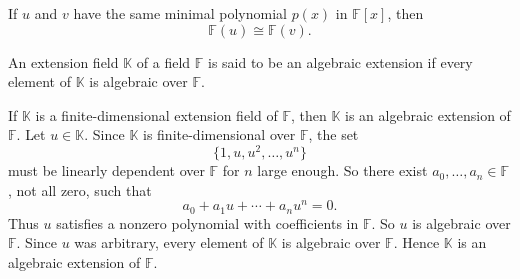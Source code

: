 \begin{corollary}{
If $u$ and $v$ have the same minimal polynomial $p(x)$ in $\mathbb{F}[x]$, then
\[
\mathbb{F}(u)\cong\mathbb{F}(v).
\]
}
\end{corollary}

\begin{definition}
An extension field $\mathbb{K}$ of a field $\mathbb{F}$ is said to be an algebraic extension if every element of $\mathbb{K}$ is algebraic over $\mathbb{F}$.
\end{definition}

\begin{theorem}{
If $\mathbb{K}$ is a finite-dimensional extension field of $\mathbb{F}$, then $\mathbb{K}$ is an algebraic extension of $\mathbb{F}$.
}
Let $u\in\mathbb{K}$.
Since $\mathbb{K}$ is finite-dimensional over $\mathbb{F}$, the set
\[
\{1,u,u^2,\hdots,u^n\}
\]
must be linearly dependent over $\mathbb{F}$ for $n$ large enough.
So there exist $a_0,\hdots,a_n\in\mathbb{F}$, not all zero, such that
\[
a_0+a_1u+\cdots+a_nu^n=0.
\]
Thus $u$ satisfies a nonzero polynomial with coefficients in $\mathbb{F}$.
So $u$ is algebraic over $\mathbb{F}$.
Since $u$ was arbitrary, every element of $\mathbb{K}$ is algebraic over $\mathbb{F}$.
Hence $\mathbb{K}$ is an algebraic extension of $\mathbb{F}$.
\end{theorem}